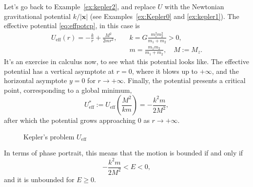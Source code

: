 \documentclass[english,fontsize=11pt,paper=a5,oneside]{scrbook}
\newcommand{\bx}{\bm{x}}
\theoremstyle{definition}
\begin{document}
Let's go back to Example~\ref{ex:kepler2}, and replace $U$ with the Newtonian gravitational potential $k/|\bx|$ (see Examples~\ref{ex:Kepler0} and \ref{ex:kepler1}).
The effective potential \eqref{eq:effpotcp}, in this case is
\begin{align}
    U_{\mathrm{eff}} (r) = -\frac kr + \frac {M^2}{2 m r^2}, \quad &k = G \frac{m_1^2 m_2^2}{m_1+m_2} > 0,\\
    &m = \frac{m_1m_2}{m_1+m_2}, \quad M := M_z.
\end{align}
It's an exercise in calculus now, to see what this potential looks like.
The effective potential has a vertical asymptote at $r=0$, where it blows up to $+\infty$,
and the horizontal asymptote $y=0$ for $r\to+\infty$.
Finally, the potential presents a critical point, corresponding to a global minimum,
\begin{equation}
    U_{\mathrm{eff}}^* := U_{\mathrm{eff}}\left(\frac{M^2}{k m}\right) = - \frac{k^2m}{2M^2},
\end{equation}
after which the potential grows approaching $0$ as $r\to+\infty$.

\begin{figure}[th]
    \centering
    \label{fig:KeplerVeff}
    \caption{Kepler's problem $U_{\mathrm{eff}}$}
\end{figure}
In terms of phase portrait, this means that the motion is bounded if and only if
\begin{equation}
    - \frac{k^2 m}{2 M^2} < E < 0,
\end{equation}
and it is unbounded for $E \geq 0$.
\end{document}
